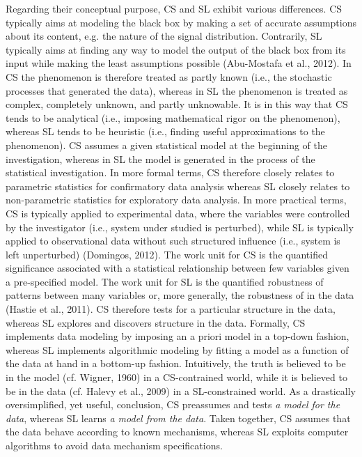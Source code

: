 \documentclass[authoryear,review,3p]{elsarticle}
\begin{document}
Regarding their conceptual purpose, CS and SL exhibit various differences.
CS typically aims at modeling the black box by making a set of
accurate assumptions about its content,
e.g. the nature of the signal distribution.
Contrarily, SL typically aims at finding any way to model
the output of the black box from its input
while making the least assumptions possible (Abu-Mostafa et al., 2012).
In CS the phenomenon is therefore treated as partly known
(i.e., the stochastic processes that generated the data),
whereas in SL the phenomenon is treated as complex,
completely unknown, and partly unknowable.
It is in this way that CS tends to be
analytical
(i.e., imposing mathematical rigor on the phenomenon),
whereas SL tends to be
heuristic
(i.e., finding useful approximations to the phenomenon).
CS assumes a given statistical model at the beginning of the investigation,
whereas in SL the model is
generated in the process of the statistical investigation.
In more formal terms,
CS therefore closely relates to parametric statistics
for confirmatory data analysis
whereas SL closely relates to non-parametric statistics
for exploratory data analysis.
In more practical terms, CS is typically applied to experimental data,
where the variables were controlled by the investigator
(i.e., system under studied is perturbed),
while SL is typically applied to observational
data without such structured influence
(i.e., system is left unperturbed) (Domingos, 2012).
The work unit for CS is the quantified
significance associated with a statistical
relationship between few variables given a pre-specified model.
The work unit for SL is the quantified robustness of patterns
between many variables or, more generally,
the robustness of  in the data (Hastie et al., 2011).
CS therefore tests for a particular structure in the data,
whereas SL explores and discovers structure in the data.
Formally, CS implements data modeling by
imposing an a priori model in a top-down fashion,
whereas SL implements algorithmic modeling by fitting
a model as a function of the data at hand in a bottom-up fashion.
%
Intuitively, the truth is believed
to be in the model (cf. Wigner, 1960) in a CS-contrained world,
while it is believed to be in the data
(cf. Halevy et al., 2009) in a SL-constrained world.
As a drastically oversimplified, yet useful, conclusion,
CS preassumes and tests \textit{a model for the data},
whereas SL learns \textit{a model from the data}.
%
Taken together,
CS assumes that the data behave according to known mechanisms,
whereas SL exploits
computer algorithms to avoid data mechanism specifications.
\end{document}
